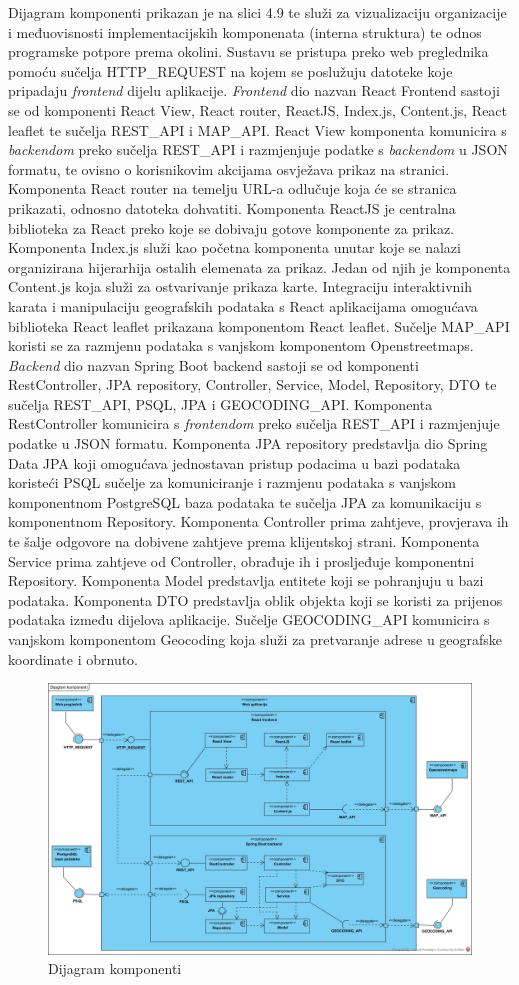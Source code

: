 Dijagram komponenti prikazan je na slici 4.9 te služi za vizualizaciju organizacije i međuovisnosti implementacijskih
komponenata (interna struktura) te odnos programske potpore prema okolini. Sustavu se pristupa preko web preglednika pomoću sučelja HTTP\_REQUEST
na kojem se poslužuju datoteke koje pripadaju \textit{frontend} dijelu aplikacije. \textit{Frontend} dio nazvan React Frontend
sastoji se od komponenti React View, React router, ReactJS, Index.js, Content.js, React leaflet te sučelja REST\_API i MAP\_API.
React View komponenta komunicira s \textit{backendom} preko sučelja REST\_API i razmjenjuje podatke s \textit{backendom} u
JSON formatu, te ovisno o korisnikovim akcijama osvježava prikaz na stranici. Komponenta React router na temelju URL-a
odlučuje koja će se stranica prikazati, odnosno datoteka dohvatiti. Komponenta ReactJS je centralna biblioteka za React
preko koje se dobivaju gotove komponente za prikaz. Komponenta Index.js služi kao početna komponenta unutar koje se nalazi
organizirana hijerarhija ostalih elemenata za prikaz. Jedan od njih je komponenta Content.js koja služi za ostvarivanje
prikaza karte. Integraciju interaktivnih karata i manipulaciju geografskih podataka s React aplikacijama omogućava biblioteka
React leaflet prikazana komponentom React leaflet. Sučelje MAP\_API koristi se za razmjenu podataka s vanjskom komponentom
Openstreetmaps. \textit{Backend} dio nazvan Spring Boot backend sastoji se od komponenti RestController, JPA repository,
Controller, Service, Model, Repository, DTO te sučelja REST\_API, PSQL, JPA i GEOCODING\_API. Komponenta RestController komunicira
s \textit{frontendom} preko sučelja REST\_API i razmjenjuje podatke u JSON formatu. Komponenta JPA repository predstavlja
dio Spring Data JPA koji omogućava jednostavan pristup podacima u bazi podataka koristeći PSQL sučelje za komuniciranje i
razmjenu podataka s vanjskom komponentnom PostgreSQL baza podataka te sučelja JPA za komunikaciju s komponentnom Repository.
Komponenta Controller prima zahtjeve, provjerava ih te šalje odgovore na dobivene zahtjeve prema klijentskoj strani. Komponenta
Service prima zahtjeve od Controller, obrađuje ih i prosljeđuje komponentni Repository. Komponenta Model predstavlja entitete
koji se pohranjuju u bazi podataka. Komponenta DTO predstavlja oblik objekta koji se koristi za prijenos podataka između
dijelova aplikacije. Sučelje GEOCODING\_API komunicira s vanjskom komponentom Geocoding koja služi za pretvaranje adrese
u geografske koordinate i obrnuto.


\begin{figure}[H]
	\includegraphics[scale=0.35]{slike/DK.jpg} %
	\centering
	\caption{Dijagram komponenti}
	\label{fig:DijagramKomponenti}
\end{figure}
